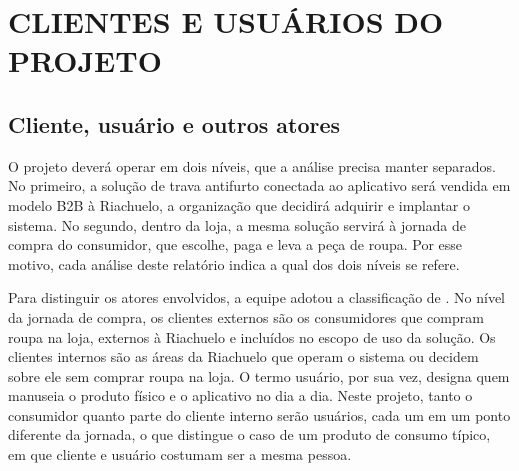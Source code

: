 %
%

\section{CLIENTES E USUÁRIOS DO PROJETO}
\label{sec:clientes_usuarios}

\subsection{Cliente, usuário e outros atores}
\label{subsec:conceitos_cliente_usuario}

O projeto deverá operar em dois níveis, que a análise precisa manter separados. No primeiro, a solução de trava antifurto conectada ao aplicativo será vendida em modelo B2B à Riachuelo, a organização que decidirá adquirir e implantar o sistema. No segundo, dentro da loja, a mesma solução servirá à jornada de compra do consumidor, que escolhe, paga e leva a peça de roupa. Por esse motivo, cada análise deste relatório indica a qual dos dois níveis se refere.

Para distinguir os atores envolvidos, a equipe adotou a classificação de . No nível da jornada de compra, os clientes externos são os consumidores que compram roupa na loja, externos à Riachuelo e incluídos no escopo de uso da solução. Os clientes internos são as áreas da Riachuelo que operam o sistema ou decidem sobre ele sem comprar roupa na loja. O termo usuário, por sua vez, designa quem manuseia o produto físico e o aplicativo no dia a dia. Neste projeto, tanto o consumidor quanto parte do cliente interno serão usuários, cada um em um ponto diferente da jornada, o que distingue o caso de um produto de consumo típico, em que cliente e usuário costumam ser a mesma pessoa.

